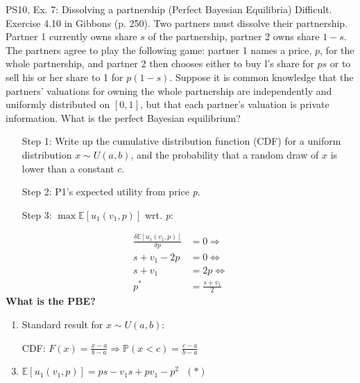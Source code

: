 \begin{frame}{PS10, Ex. 7: Dissolving a partnership (Perfect Bayesian Equilibria)}
    Difficult. Exercise 4.10 in Gibbons (p. 250). Two partners must dissolve their partnership. Partner 1 currently owns share $s$ of the partnership, partner 2 owns share $1-s$. The partners agree to play the following game: partner 1 names a price, $p$, for the whole partnership, and partner 2 then chooses either to buy l's share for $ps$ or to sell his or her share to 1 for $p(1-s)$. Suppose it is common knowledge that the partners' valuations for owning the whole partnership are independently and uniformly distributed on $[0,1]$, but that each partner's valuation is private information. What is the perfect Bayesian equilibrium?\vspace{-11pt}
    \begin{multicols}{2}
      \begin{itemize}
        \item[Step 1:] Write up the cumulative distribution function (CDF) for a uniform distribution $x\sim U(a, b)$, and the probability that a random draw of $x$ is lower than a constant $c$.
        \item[Step 2:] P1's expected utility from price \textit{p}.
        \item[Step 3:] $\max\mathbb{E}[u_1(v_1,p)]$ wrt. \textit{p}:
      \end{itemize}\vspace{-6pt}
      \begin{align*}
        \frac{\delta \mathbb{E}[u_1(v_1,p)]}{\delta p}&=0\Rightarrow\\
        s+v_1-2p&=0\Leftrightarrow\\
        s+v_1&=2p\Leftrightarrow\\
        p^*&=\frac{s+v_1}{2}
      \end{align*}
      \textbf{What is the PBE?}
      \vfill\null\columnbreak
      \begin{enumerate}
        \item Standard result for $x\sim U(a, b):$
        \item[CDF:] $F(x)=\frac{x-a}{b-a}\Rightarrow\mathbb{P}(x<c)=\frac{c-a}{b-a}$
        \item $\mathbb{E}[u_1(v_1,p)]=ps-v_1s+pv_1-p^2\ \ \ (*)$
      \end{enumerate}
      \vfill\null
    \end{multicols}
\end{frame}
